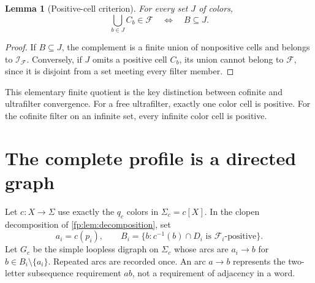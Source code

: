 \documentclass[11pt,letterpaper]{article}
\numberwithin{equation}{section}
\newtheorem{lemma}[lemma]{Lemma}
\theoremstyle{definition}
\theoremstyle{remark}
\theoremstyle{definition}
\newcommand{\F}{\mathcal F}
\newcommand{\I}{\mathcal I}
\begin{document}
\begin{lemma}[Positive-cell criterion]\label{fp:lem:positive}
For every set \(J\) of colors,
\[
 \bigcup_{b\in J}C_b\in\F\quad\Longleftrightarrow\quad B\subseteq J.
\]
\end{lemma}
\begin{proof}
If \(B\subseteq J\), the complement is a finite union of nonpositive
cells and belongs to \(\I_{\F}\). Conversely, if \(J\) omits a
positive cell \(C_b\), its union cannot belong to \(\F\), since it is
disjoint from a set meeting every filter member.
\end{proof}

This elementary finite quotient is the key distinction between cofinite
and ultrafilter convergence. For a free ultrafilter, exactly one color
cell is positive. For the cofinite filter on an infinite set, every infinite
color cell is positive.

\section{The complete profile is a directed graph}
\label{fp:sec:profile}

Let \(c:X\to\Sigma\) use exactly the \(q_c\) colors in \(\Sigma_c=c[X]\).
In the clopen decomposition of \cref{fp:lem:decomposition}, set
\[
 a_i=c(p_i),\qquad
 B_i=\{b:c^{-1}(b)\cap D_i\text{ is }\F_i\text{-positive}\}.
\]
Let \(G_c\) be the simple loopless digraph on \(\Sigma_c\) whose arcs
are \(a_i\to b\) for \(b\in B_i\setminus\{a_i\}\). Repeated arcs
are recorded once. An arc \(a\to b\) represents the two-letter
subsequence requirement \(ab\), not a requirement of adjacency in a word.
\end{document}
